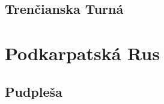 \documentclass[a4paper]{book}
\begin{document}
\begin{center}
\section*{Trenčianska Turná}
{%
\parindent 0pt
\noindent
\ifx\preLilyPondExample \undefined
\else
  \expandafter\preLilyPondExample
\fi
\def\lilypondbook{}%

\ifx\postLilyPondExample \undefined
\else
  \expandafter\postLilyPondExample
\fi
}
{%
\parindent 0pt
\noindent
\ifx\preLilyPondExample \undefined
\else
  \expandafter\preLilyPondExample
\fi
\def\lilypondbook{}%

\ifx\postLilyPondExample \undefined
\else
  \expandafter\postLilyPondExample
\fi
}
{%
\parindent 0pt
\noindent
\ifx\preLilyPondExample \undefined
\else
  \expandafter\preLilyPondExample
\fi
\def\lilypondbook{}%

\ifx\postLilyPondExample \undefined
\else
  \expandafter\postLilyPondExample
\fi
}
{%
\parindent 0pt
\noindent
\ifx\preLilyPondExample \undefined
\else
  \expandafter\preLilyPondExample
\fi
\def\lilypondbook{}%

\ifx\postLilyPondExample \undefined
\else
  \expandafter\postLilyPondExample
\fi
}
{%
\parindent 0pt
\noindent
\ifx\preLilyPondExample \undefined
\else
  \expandafter\preLilyPondExample
\fi
\def\lilypondbook{}%

\ifx\postLilyPondExample \undefined
\else
  \expandafter\postLilyPondExample
\fi
}
{%
\parindent 0pt
\noindent
\ifx\preLilyPondExample \undefined
\else
  \expandafter\preLilyPondExample
\fi
\def\lilypondbook{}%

\ifx\postLilyPondExample \undefined
\else
  \expandafter\postLilyPondExample
\fi
}
{%
\parindent 0pt
\noindent
\ifx\preLilyPondExample \undefined
\else
  \expandafter\preLilyPondExample
\fi
\def\lilypondbook{}%

\ifx\postLilyPondExample \undefined
\else
  \expandafter\postLilyPondExample
\fi
}

\chapter*{Podkarpatská Rus}
\section*{Pudpleša}
{%
\parindent 0pt
\noindent
\ifx\preLilyPondExample \undefined
\else
  \expandafter\preLilyPondExample
\fi
\def\lilypondbook{}%

\ifx\postLilyPondExample \undefined
\else
  \expandafter\postLilyPondExample
\fi
}
{%
\parindent 0pt
\noindent
\ifx\preLilyPondExample \undefined
\else
  \expandafter\preLilyPondExample
\fi
\def\lilypondbook{}%

\ifx\postLilyPondExample \undefined
\else
  \expandafter\postLilyPondExample
\fi
}
{%
\parindent 0pt
\noindent
\ifx\preLilyPondExample \undefined
\else
  \expandafter\preLilyPondExample
\fi
\def\lilypondbook{}%

\ifx\postLilyPondExample \undefined
\else
  \expandafter\postLilyPondExample
\fi
}


\end{center}
\end{document}
